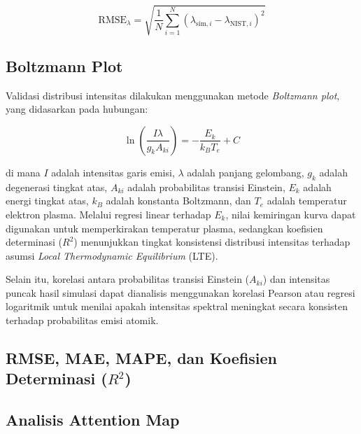 \begin{equation}
\mathrm{RMSE}_{\lambda} =
\sqrt{\frac{1}{N}\sum_{i=1}^{N}
(\lambda_{\mathrm{sim},i}-\lambda_{\mathrm{NIST},i})^2}
\end{equation}

\subsection{Boltzmann Plot}

Validasi distribusi intensitas dilakukan menggunakan metode \textit{Boltzmann plot}, yang didasarkan pada hubungan:

\begin{equation}
\ln\left(
\frac{I\lambda}{g_k A_{ki}}
\right)
=
-\frac{E_k}{k_B T_e}+C
\end{equation}

di mana $I$ adalah intensitas garis emisi, $\lambda$ adalah panjang gelombang, $g_k$ adalah degenerasi tingkat atas, $A_{ki}$ adalah probabilitas transisi Einstein, $E_k$ adalah energi tingkat atas, $k_B$ adalah konstanta Boltzmann, dan $T_e$ adalah temperatur elektron plasma. Melalui regresi linear terhadap $E_k$, nilai kemiringan kurva dapat digunakan untuk memperkirakan temperatur plasma, sedangkan koefisien determinasi ($R^2$) menunjukkan tingkat konsistensi distribusi intensitas terhadap asumsi \textit{Local Thermodynamic Equilibrium} (LTE).

Selain itu, korelasi antara probabilitas transisi Einstein ($A_{ki}$) dan intensitas puncak hasil simulasi dapat dianalisis menggunakan korelasi Pearson atau regresi logaritmik untuk menilai apakah intensitas spektral meningkat secara konsisten terhadap probabilitas emisi atomik.

\subsection{RMSE, MAE, MAPE, dan Koefisien Determinasi ($R^2$)}

\subsection{Analisis Attention Map}

